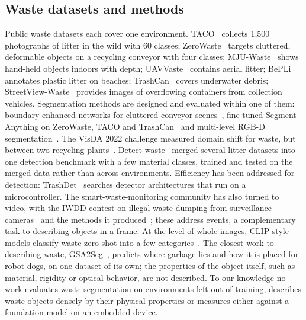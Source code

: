 \documentclass[pdflatex,sn-basic,Numbered]{sn-jnl}%
\begin{document}
\subsection{Waste datasets and methods}\label{sec:rel-waste}
Public waste datasets each cover one environment. TACO~\cite{proenca2020taco} collects 1{,}500 photographs of litter in the wild with 60 classes; ZeroWaste~\cite{bashkirova2022zerowaste} targets cluttered, deformable objects on a recycling conveyor with four classes; MJU-Waste~\cite{wang2020mjuwaste} shows hand-held objects indoors with depth; UAVVaste~\cite{kraft2021uavvaste} contains aerial litter; BePLi~\cite{bepli2023} annotates plastic litter on beaches; TrashCan~\cite{hong2020trashcan} covers underwater debris; StreetView-Waste~\cite{paulo2026streetview} provides images of overflowing containers from collection vehicles. Segmentation methods are designed and evaluated within one of them: boundary-enhanced networks for cluttered conveyor scenes~\cite{cosnet2025,javaid2026cluttered}, fine-tuned Segment Anything on ZeroWaste, TACO and TrashCan~\cite{aboubaker2023dontwaste} and multi-level RGB-D segmentation~\cite{wang2020mjuwaste}. The VisDA 2022 challenge measured domain shift for waste, but between two recycling plants~\cite{bashkirova2023visda}. Detect-waste~\cite{majchrowska2022detectwaste} merged several litter datasets into one detection benchmark with a few material classes, trained and tested on the merged data rather than across environments. Efficiency has been addressed for detection: TrashDet~\cite{tran2026trashdet} searches detector architectures that run on a microcontroller. The smart-waste-monitoring community has also turned to video, with the IWDD contest on illegal waste dumping from surveillance cameras~\cite{iwdd2026} and the methods it produced~\cite{scarrica2026garberus,almorsy2026x3d}; these address events, a complementary task to describing objects in a frame. At the level of whole images, CLIP-style models classify waste zero-shot into a few categories~\cite{mewada2025zeroshot}. The closest work to describing waste, GSA2Seg~\cite{xu2024gsa2seg}, predicts where garbage lies and how it is placed for robot dogs, on one dataset of its own; the properties of the object itself, such as material, rigidity or optical behavior, are not described. To our knowledge no work evaluates waste segmentation on environments left out of training, describes waste objects densely by their physical properties or measures either against a foundation model on an embedded device.
\end{document}
